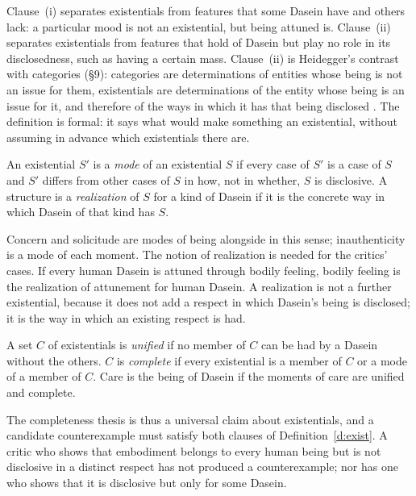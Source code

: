 \documentclass{situationist-preprint}
\begin{document}
Clause~(i) separates existentials from features that some Dasein have and others lack: a particular mood is not an existential, but being attuned is. Clause~(ii) separates existentials from features that hold of Dasein but play no role in its disclosedness, such as having a certain mass. Clause~(ii) is Heidegger's contrast with categories (\S9): categories are determinations of entities whose being is not an issue for them, existentials are determinations of the entity whose being is an issue for it, and therefore of the ways in which it has that being disclosed \citep[\S9]{Heidegger1927}. The definition is formal: it says what would make something an existential, without assuming in advance which existentials there are.

\begin{definition}\label{d:mode}
An existential $S'$ is a \emph{mode} of an existential $S$ if every case of $S'$ is a case of $S$ and $S'$ differs from other cases of $S$ in how, not in whether, $S$ is disclosive. A structure is a \emph{realization} of $S$ for a kind of Dasein if it is the concrete way in which Dasein of that kind has $S$.
\end{definition}

Concern and solicitude are modes of being alongside in this sense; inauthenticity is a mode of each moment. The notion of realization is needed for the critics' cases. If every human Dasein is attuned through bodily feeling, bodily feeling is the realization of attunement for human Dasein. A realization is not a further existential, because it does not add a respect in which Dasein's being is disclosed; it is the way in which an existing respect is had.

\begin{definition}\label{d:comp}
A set $C$ of existentials is \emph{unified} if no member of $C$ can be had by a Dasein without the others. $C$ is \emph{complete} if every existential is a member of $C$ or a mode of a member of $C$. Care is the being of Dasein if the moments of care are unified and complete.
\end{definition}

The completeness thesis is thus a universal claim about existentials, and a candidate counterexample must satisfy both clauses of Definition~\ref{d:exist}. A critic who shows that embodiment belongs to every human being but is not disclosive in a distinct respect has not produced a counterexample; nor has one who shows that it is disclosive but only for some Dasein.
\end{document}
